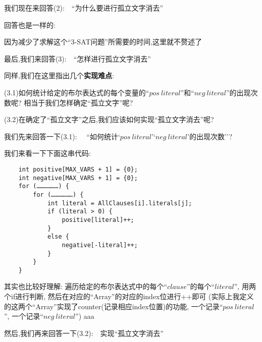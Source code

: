         \noindent
        我们现在来回答(2):$\quad$``为什么要进行孤立文字消去''
        \newline
        \par
        回答也是一样的:
        \newline
        \par
            因为减少了求解这个``3-SAT问题''所需要的时间,这里就不赘述了
        \newline
        \par
        最后,我们来回答(3):$\quad$``怎样进行孤立文字消去''
        \newline
        \par
        同样,我们在这里指出几个\textbf{实现难点}:
        \newline
        \par
        (3.1)如何统计给定的布尔表达式的每个变量的``$pos \ literal$''和``$neg\ literal$''的出现次数呢?
        相当于我们怎样确定``孤立文字''呢?
        \par
        (3.2)在确定了``孤立文字''之后,我们应该如何实现``孤立文字消去''呢?
        \newline
        \par
        我们先来回答一下(3.1):$\quad$ ``如何统计`$pos\ literal$'`$neg\ literal$'的出现次数''?
        \newline
        \par
        我们来看一下下面这串代码:
        \begin{lstlisting}
    int positive[MAX_VARS + 1] = {0};  
    int negative[MAX_VARS + 1] = {0};  
    for (………………) {
        for (………………) {
            int literal = AllClauses[i].literals[j];
            if (literal > 0) {
                positive[literal]++;  
            } 
            else {
                negative[-literal]++;
            }
        }
    }
        \end{lstlisting}
        \par
        其实也比较好理解:
        遍历给定的布尔表达式中的每个``$clause$''的每个``$literal$'',
        用两个if进行判断,
        然后在对应的``Array''的对应的index位进行++即可
        (实际上我定义的这两个``Array''实现了counter(记录相应index位置)的功能,
        一个记录``$pos \ literal$'',
        一个记录``$neg\ literal$'')
        aaa
        \newline
        \par
        然后,我们再来回答一下(3.2):$\quad$实现``孤立文字消去''
        \newline
        \par
